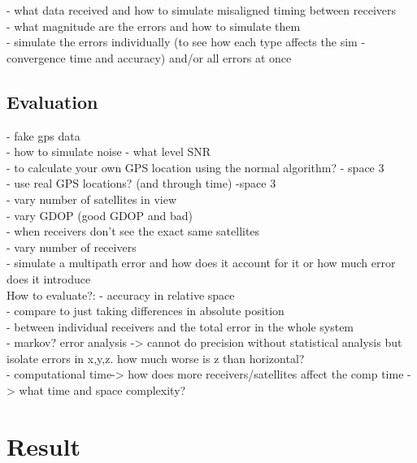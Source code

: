 \documentclass[11pt,a4paper]{article}
\begin{document}
- what data received and how to simulate misaligned timing between receivers\\
- what magnitude are the errors and how to simulate them\\
- simulate the errors individually (to see how each type affects the sim - convergence time and accuracy) and/or all errors at once


\subsection{Evaluation} %
- fake gps data\\
- how to simulate noise - what level SNR\\
- to calculate your own GPS location using the normal algorithm? - space 3 \\
- use real GPS locations? (and through time) -space 3\\
- vary number of satellites in view\\
- vary GDOP (good GDOP and bad)\\
- when receivers don't see the exact same satellites \\
- vary number of receivers \\
- simulate a multipath error and how does it account for it or how much error does it introduce\\

How to evaluate?:
- accuracy in relative space\\
- compare to just taking differences in absolute position \\
- between individual receivers and the total error in the whole system\\
- markov? error analysis -> cannot do precision without statistical analysis but isolate errors in x,y,z. how much worse is z than horizontal?\\
- computational time-> how does more receivers/satellites affect the comp time -> what time and space complexity?


\section{Result}





\end{document}
